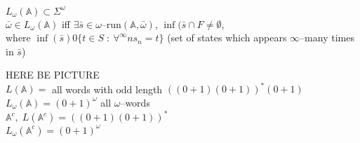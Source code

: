 {
    $L_{\omega}(\mathbb{A}) \subset \Sigma^{\omega}$ \\
    $\bar{\omega} \in L_{\omega}(\mathbb{A})$ iff $\exists \bar{s} \in \omega\text{--run}(\mathbb{A},\bar{\omega}) $, $\inf(\bar{s}\cap F \neq \emptyset$,\\
    where $\inf(\bar{s}) 0 \{ t \in S\; : \: \forall^{\infty} n s_n = t \} $ 
    (set of states which appears $\infty$--many times in  $\bar{s}$)
}
\ex{}
{
    HERE BE PICTURE\\
    $L(\mathbb{A}) = $ all words with odd length $((0+1)(0+1))^{*}(0+1)$\\
    $L_{\omega}(\mathbb{A}) = (0+1)^{\omega} $ all $\omega$--words\\
    $\mathbb{A}^{c}, \; L(\mathbb{A}^{c}) = ((0+1)(0+1))^{*}$ \\
    $L_{\omega}(\mathbb{A}^{c}) = (0+1)^{\omega}$

}
